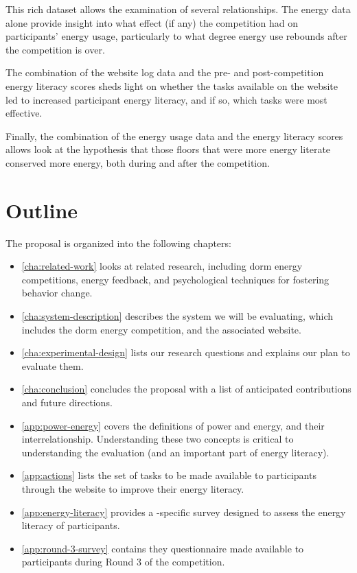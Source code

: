 This rich dataset allows the examination of several relationships. The energy data alone provide insight into what effect (if any) the competition had on participants' energy usage, particularly to what degree energy use rebounds after the competition is over.

The combination of the website log data and the pre- and post-competition energy literacy scores sheds light on whether the tasks available on the website led to increased participant energy literacy, and if so, which tasks were most effective.

Finally, the combination of the energy usage data and the energy literacy scores allows look at the hypothesis that those floors that were more energy literate conserved more energy, both during and after the competition.


\section{Outline}

The proposal is organized into the following chapters:

\begin{itemize}
	\item \autoref{cha:related-work} looks at related research, including dorm energy competitions, energy feedback, and psychological techniques for fostering behavior change.
	\item \autoref{cha:system-description} describes the system we will be evaluating, which includes the dorm energy competition, and the associated website.
	\item \autoref{cha:experimental-design} lists our research questions and explains our plan to evaluate them.
	\item \autoref{cha:conclusion} concludes the proposal with a list of anticipated contributions and future directions.
	\item \autoref{app:power-energy} covers the definitions of power and energy, and their interrelationship. Understanding these two concepts is critical to understanding the evaluation (and an important part of energy literacy).
	\item \autoref{app:actions} lists the set of tasks to be made available to participants through the website to improve their energy literacy.
	\item \autoref{app:energy-literacy} provides a \Hawaii-specific survey designed to assess the energy literacy of participants.
	\item \autoref{app:round-3-survey} contains they questionnaire made available to participants during Round 3 of the competition.
\end{itemize}
